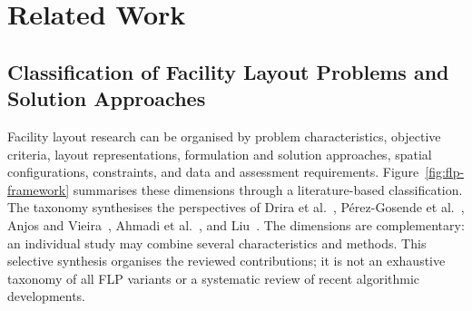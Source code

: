 \documentclass[10pt,a4paper]{article}
\begin{document}
\section{Related Work}
\subsection{Classification of Facility Layout Problems and Solution Approaches}

Facility layout research can be organised by problem characteristics,
objective criteria, layout representations, formulation and solution approaches,
spatial configurations, constraints, and data and assessment requirements.
Figure~\ref{fig:flp-framework} summarises these dimensions through a
literature-based classification. The taxonomy synthesises the perspectives of
Drira et al.\ \cite{drira2007}, P\'{e}rez-Gosende et al.\ \cite{perez2021},
Anjos and Vieira\ \cite{anjos2017}, Ahmadi et al.\ \cite{ahmadi2017},
and Liu\ \cite{liu2004}. The dimensions are complementary: an individual
study may combine several characteristics and methods. This selective synthesis
organises the reviewed contributions; it is not an exhaustive taxonomy of all
FLP variants or a systematic review of recent algorithmic developments.
\end{document}
